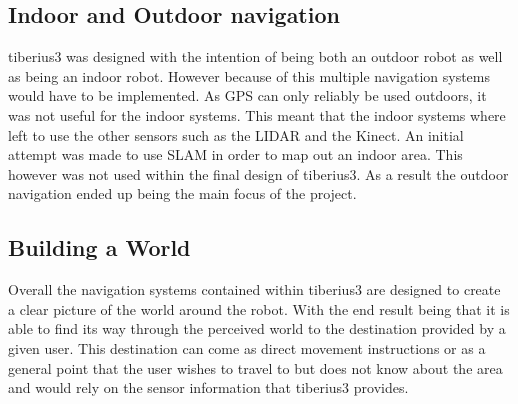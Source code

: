 \subsection{Indoor and Outdoor navigation}
\gls{tiberius3} was designed with the intention of being both an outdoor robot as well as being an indoor robot. However because of this multiple navigation systems would have to be implemented. As \gls{GPS} can only reliably be used outdoors, it was not useful for the indoor systems. This meant that the indoor systems where left to use the other sensors such as the \gls{LIDAR} and the Kinect. An initial attempt was made to use \gls{SLAM} in order to map out an indoor area. This however was not used within the final design of \gls{tiberius3}. As a result the outdoor navigation ended up being the main focus of the project.

\subsection{Building a World}
Overall the navigation systems contained within \gls{tiberius3} are designed to create a clear picture of the world around the robot. With the end result being that it is able to find its way through the perceived world to the destination provided by a given user. This destination can come as direct movement instructions or as a general point that the user wishes to travel to but does not know about the area and would rely on the sensor information that \gls{tiberius3} provides.